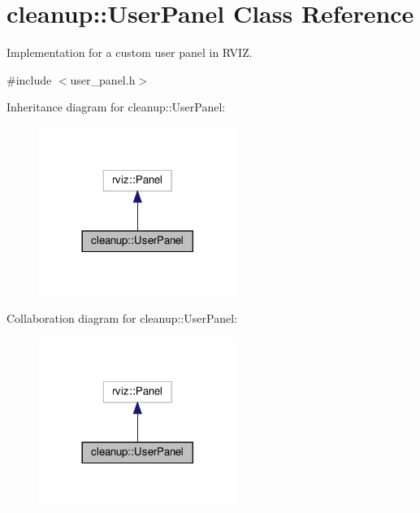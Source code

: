 \hypertarget{classcleanup_1_1_user_panel}{}\section{cleanup\+:\+:User\+Panel Class Reference}
\label{classcleanup_1_1_user_panel}


Implementation for a custom user panel in R\+V\+IZ.  




{\ttfamily \#include $<$user\+\_\+panel.\+h$>$}



Inheritance diagram for cleanup\+:\+:User\+Panel\+:
\nopagebreak
\begin{figure}[H]
\begin{center}
\leavevmode
\includegraphics[width=182pt]{classcleanup_1_1_user_panel__inherit__graph}
\end{center}
\end{figure}


Collaboration diagram for cleanup\+:\+:User\+Panel\+:
\nopagebreak
\begin{figure}[H]
\begin{center}
\leavevmode
\includegraphics[width=182pt]{classcleanup_1_1_user_panel__coll__graph}
\end{center}
\end{figure}
